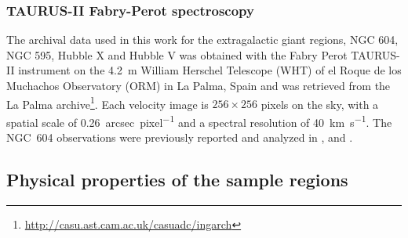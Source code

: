 \documentclass[fleqn,usenatbib, useAMS, a4paper]{mnras}
\begin{document}
\subsubsection{TAURUS-II Fabry-Perot spectroscopy}
\label{sec:taurus-ii-fabry}

The archival data used in this work for the extragalactic giant regions, NGC 604, NGC 595, Hubble X and Hubble V was obtained with the Fabry Perot TAURUS-II instrument
\citep{Gordon:2000v}
on the \SI{4.2}{m} William Herschel Telescope (WHT) of
el Roque de los Muchachos Observatory (ORM) in La Palma, Spain
and was retrieved from the La Palma archive\footnote{\url{http://casu.ast.cam.ac.uk/casuadc/ingarch}}.
Each velocity image is \(256 \times 256\) pixels on the sky,
with a spatial scale of \SI{0.26}{arcsec.pixel^{-1}}
and a spectral resolution of \SI{40}{km.s^{-1}}.
The NGC~604 observations were previously reported and analyzed in
\citet{sabalisck1995supersonic}, \citet{Medina-Tanco:1997a} and \citet{Melnick:2021x}.



\subsection{Physical properties of the sample regions}
\label{sec:regions-milky-way}
\end{document}
